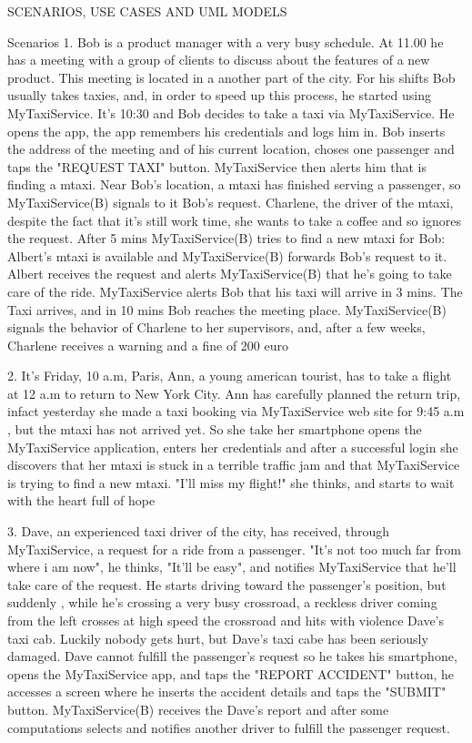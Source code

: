 \documentclass[11pt]{article} %
\begin{document}
SCENARIOS, USE CASES AND UML MODELS

    Scenarios
    1. Bob is a product manager with a very busy schedule. At 11.00 he has a meeting
       with a group of clients to discuss about the features of a new product.
       This meeting is located in a another part of the city.
       For his shifts Bob usually takes taxies, and, in order to speed up this process, he
       started using MyTaxiService.
       It's 10:30 and Bob decides to take a taxi via MyTaxiService. He opens the app,
       the app remembers his credentials and logs him in.
       Bob inserts the address of the meeting and of his current location, choses one passenger and taps
       the "REQUEST TAXI" button. MyTaxiService then alerts him that is finding a mtaxi.
       Near Bob's location, a mtaxi has finished serving a passenger, so MyTaxiService(B) signals to it
       Bob's request. Charlene, the driver of the mtaxi, despite the fact that it's still work time, she wants to take a coffee
       and so ignores the request. After 5 mins MyTaxiService(B) tries to find a new mtaxi
       for Bob: Albert's mtaxi is available and MyTaxiService(B) forwards Bob's request to it.
       Albert receives the request and alerts MyTaxiService(B) that he's going to take care of the ride.
       MyTaxiService alerts Bob that his taxi will arrive in 3 mins.
       The Taxi arrives, and in 10 mins Bob reaches the meeting place. MyTaxiService(B)
       signals the behavior of Charlene to her supervisors, and, after a few weeks, Charlene receives a warning and a fine of 200 euro

    2. It's Friday, 10 a.m, Paris, Ann, a young american tourist, has to take a flight at 12 a.m to return to New York City.
        Ann has carefully planned the return trip, infact
       yesterday she made a taxi booking via MyTaxiService web site for 9:45 a.m , but the mtaxi has not arrived yet.
       So she take her smartphone opens the MyTaxiService application, enters her credentials and after a successful login
       she discovers that her mtaxi is stuck in a terrible traffic jam and that MyTaxiService is trying to find a new mtaxi.
       "I'll miss my flight!" she thinks, and starts to wait with the heart full of hope

    3. Dave, an experienced taxi driver of the city, has received, through MyTaxiService, a request for a ride
       from a passenger. "It's not too much far from where i am now", he thinks, "It'll be easy", and notifies
       MyTaxiService that he'll take care of the request. He starts driving toward the passenger's position, but suddenly
       , while he's crossing a very busy crossroad,
       a reckless driver coming from the left crosses at high speed the crossroad and hits with violence
       Dave's taxi cab. Luckily nobody gets hurt, but Dave's taxi cabe has been seriously damaged.
       Dave cannot fulfill the passenger's request so he takes his smartphone, opens the MyTaxiService app,
       and taps the "REPORT ACCIDENT" button, he accesses a screen where he inserts the accident details and taps the "SUBMIT" button.
       MyTaxiService(B) receives the Dave's report and after some computations selects and notifies another driver to fulfill the passenger request.
\end{document}
